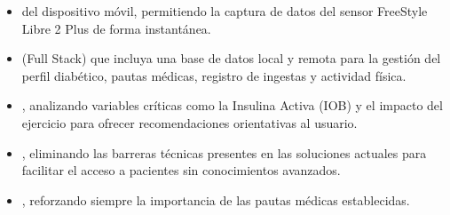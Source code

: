 \begin{itemize}
\item {} del dispositivo móvil, permitiendo la captura de datos del sensor FreeStyle Libre 2 Plus de forma instantánea.

\item {} (Full Stack) que incluya una base de datos local y remota para la gestión del perfil diabético, pautas médicas, registro de ingestas y actividad física.

\item {}, analizando variables críticas como la Insulina Activa (IOB) y el impacto del ejercicio para ofrecer recomendaciones orientativas al usuario.

\item {}, eliminando las barreras técnicas presentes en las soluciones actuales para facilitar el acceso a pacientes sin conocimientos avanzados.

\item {}, reforzando siempre la importancia de las pautas médicas establecidas.

\end{itemize}
